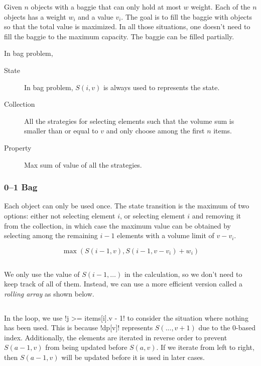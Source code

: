\documentclass{article}
\begin{document}
Given $n$ objects with a baggie that can only hold at most $w$ weight. Each of the $n$ objects has a weight $w_i$ and a value $v_i$. The goal is to fill the baggie with objects so that the total value is maximized. In all those situations, one doesn't need to fill the baggie to the maximum capacity. The baggie can be filled partially.

In bag problem,

\begin{description}
	\item[State] In bag problem, $S(i, v)$ is always used to represents the state.
	\item[Collection] All the strategies for selecting elements such that the volume sum is smaller than or equal to $v$ and only choose among the first $n$ items.
	\item[Property] Max sum of value of all the strategies.
\end{description}

\subsubsection{0--1 Bag}

Each object can only be used once. The state transition is the maximum of two options: either not selecting element $i$, or selecting element $i$ and removing it from the collection, in which case the maximum value can be obtained by selecting among the remaining $i - 1$ elements with a volume limit of $v - v_i$.

\[
	\max(S(i - 1, v), S(i - 1, v - v_i) + w_i)
\]

\begin{center}
	\inputminted[firstline=5]{cpp}{src/struct-0-1-rudimentary-bag.cpp}%
\end{center}

We only use the value of $S(i - 1, \ldots)$ in the calculation, so we don't need to keep track of all of them. Instead, we can use a more efficient version called a \emph{rolling array} as shown below.

\begin{center}
	\inputminted[firstline=5]{cpp}{src/struct-0-1-bag.cpp}
\end{center}

In the loop, we use \mono!j >= items[i].v - 1! to consider the situation where nothing has been used. This is because \mono!dp[v]! represents $S(..., v + 1)$ due to the 0-based index. Additionally, the elements are iterated in reverse order to prevent $S(a-1,v)$ from being updated before $S(a,v)$. If we iterate from left to right, then $S(a-1,v)$ will be updated before it is used in later cases.
\end{document}

